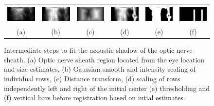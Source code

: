 \documentclass{llncs}
\begin{document}
\begin{figure}
\centering
\begin{tabular}{cccccc}
\includegraphics[height=0.36in]{019-nerve.png} &
\includegraphics[height=0.37in]{019-nerve-smooth.png} &
\includegraphics[height=0.36in]{019-nerve-distance.png} &
\includegraphics[height=0.36in]{019-nerve-scaled.png} &
\includegraphics[height=0.36in]{019-nerve-thres.png} &         
\includegraphics[height=0.36in]{019-nerve-moving.png} \\         
(a) & (b) & (c) & (d) & (e) & (f)
\end{tabular}
\caption{
\label{fig:algorithm-nerve}
Intermediate steps to fit the acoustic shadow of the optic nerve sheath. (a)
Optic nerve sheath region located from the eye location and size estimates, (b)
Gaussian smooth and intensity scaling of individual rows, (c) Distance
transform, (d) scaling of rows independently left and right of the initial
center (e) thresholding and (f) vertical bars before registration based on intial
estimates.
}
\end{figure}
\end{document}
